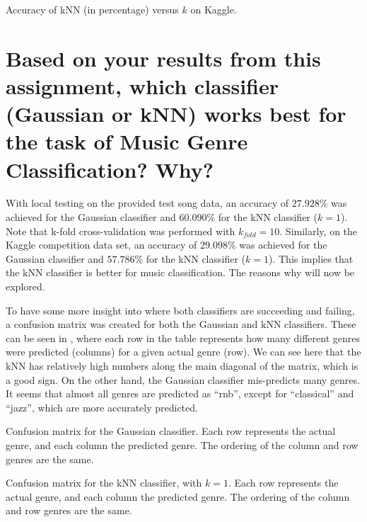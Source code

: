 \documentclass[a4paper,titlepage]{article}
\begin{document}
	\begin{table}[!htb]
		\centering
		\caption{Accuracy of kNN (in percentage) versus $k$ on Kaggle.}
		\label{table:knn_accuracy_kaggle}
	\end{table}
	
	
	\section{Based on your results from this assignment, which classifier (Gaussian or kNN) works best for the task of Music Genre Classification? Why?}
	
	With local testing on the provided test song data, an accuracy of $27.928\%$ was achieved for the Gaussian classifier and $60.090\%$ for the kNN classifier ($k = 1$). Note that k-fold cross-validation was performed with $k_{fold}=10$. Similarly, on the Kaggle competition data set, an accuracy of $29.098\%$ was achieved for the Gaussian classifier and $57.786\%$ for the kNN classifier ($k = 1$). This implies that the kNN classifier is better for music classification. The reasons why will now be explored.
	
	To have some more insight into where both classifiers are succeeding and failing, a confusion matrix was created for both the Gaussian and kNN classifiers. These can be seen in , where each row in the table represents how many different genres were predicted (columns) for a given actual genre (row). We can see here that the kNN has relatively high numbers along the main diagonal of the matrix, which is a good sign. On the other hand, the Gaussian classifier mis-predicts many genres. It seems that almost all genres are predicted as ``rnb'', except for ``classical'' and ``jazz'', which are more accurately predicted.
	
	\begin{table}[!htb]
		\centering
		\caption{Confusion matrix for the Gaussian classifier. Each row represents the actual genre, and each column the predicted genre. The ordering of the column and row genres are the same.}
		\label{table:confusion_gaussian}
	\end{table}

	\begin{table}[!htb]
		\centering
		\caption{Confusion matrix for the kNN classifier, with $k = 1$. Each row represents the actual genre, and each column the predicted genre. The ordering of the column and row genres are the same.}
		\label{table:confusion_knn_1}
	\end{table}
	
\end{document}
